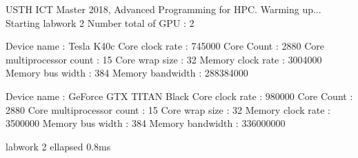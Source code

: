 USTH ICT Master 2018, Advanced Programming for HPC.
Warming up...
Starting labwork 2
Number total of GPU : 2

Device name : Tesla K40c
Core clock rate : 745000
Core Count : 2880
Core multiprocessor count : 15
Core wrap size : 32
Memory clock rate : 3004000
Memory bus width : 384
Memory bandwidth : 288384000

Device name : GeForce GTX TITAN Black
Core clock rate : 980000
Core Count : 2880
Core multiprocessor count : 15
Core wrap size : 32
Memory clock rate : 3500000
Memory bus width : 384
Memory bandwidth : 336000000

labwork 2 ellapsed 0.8ms
